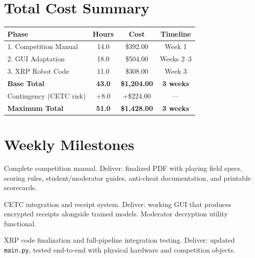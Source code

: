 \documentclass[a4paper]{article}
\begin{document}
\section*{Total Cost Summary}

\begin{center}
\begin{tabular}{lccc}
\toprule
\textbf{Phase} & \textbf{Hours} & \textbf{Cost} & \textbf{Timeline} \\
\midrule
1. Competition Manual & 14.0 & \$392.00 & Week 1 \\
2. GUI Adaptation & 18.0 & \$504.00 & Weeks 2--3 \\
3. XRP Robot Code & 11.0 & \$308.00 & Week 3 \\
\midrule
\textbf{Base Total} & \textbf{43.0} & \textbf{\$1,204.00} & \textbf{3 weeks} \\
\midrule
Contingency (CETC risk) & +8.0 & +\$224.00 & --- \\
\midrule
\textbf{Maximum Total} & \textbf{51.0} & \textbf{\$1,428.00} & \textbf{3 weeks} \\
\bottomrule
\end{tabular}
\end{center}

\section*{Weekly Milestones}

\begin{description}[leftmargin=!,labelwidth=5em]
    \item[Week 1] Complete competition manual. Deliver: finalized PDF with playing field specs, scoring rules, student/moderator guides, anti-cheat documentation, and printable scorecards.

    \item[Week 2] CETC integration and receipt system. Deliver: working GUI that produces encrypted receipts alongside trained models. Moderator decryption utility functional.

    \item[Week 3] XRP code finalization and full-pipeline integration testing. Deliver: updated \texttt{main.py}, tested end-to-end with physical hardware and competition objects.
\end{description}
\end{document}
